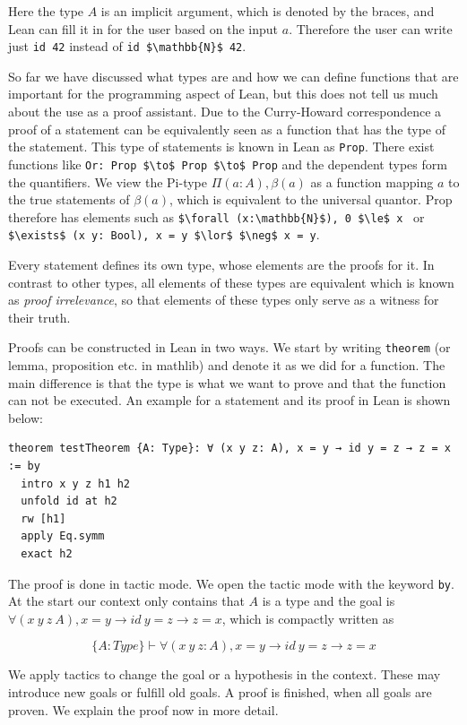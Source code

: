 Here the type $A$ is an implicit argument, which is denoted by the braces, and Lean can fill it in for the user based on the input $a$. Therefore the user can write just \lstinline|id 42| instead of \lstinline|id $\mathbb{N}$ 42|.

So far we have discussed what types are and how we can define functions that are important for the programming aspect of Lean, but this does not tell us much about the use as a proof assistant. Due to the Curry-Howard correspondence a proof of a statement can be equivalently seen as a function that has the type of the statement. This type of statements is known in Lean as \lstinline|Prop|. There exist functions like \lstinline|Or: Prop $\to$ Prop $\to$ Prop| and the dependent types form the quantifiers. We view the Pi-type $\Pi (a:A), \beta(a)$ as a function mapping $a$ to the true statements of $\beta(a)$, which is equivalent to the universal quantor. Prop therefore has elements such as \lstinline|$\forall (x:\mathbb{N}$), 0 $\le$ x | or \lstinline|$\exists$ (x y: Bool), x = y $\lor$ $\neg$ x = y|.

Every statement defines its own type, whose elements are the proofs for it. In contrast to other types, all elements of these types are equivalent which is known as \textit{proof irrelevance}, so that elements of these types only serve as a witness for their truth.

Proofs can be constructed in Lean in two ways.  We start by writing \lstinline|theorem| (or lemma, proposition etc. in mathlib) and denote it as we did for a function. The main difference is that the type is what we want to prove and that the function can not be executed. An example for a statement and its proof in Lean is shown below:

\begin{lstlisting}
theorem testTheorem {A: Type}: ∀ (x y z: A), x = y → id y = z → z = x := by
  intro x y z h1 h2
  unfold id at h2
  rw [h1]
  apply Eq.symm
  exact h2
\end{lstlisting}

The proof is done in tactic mode. We open the tactic mode with the keyword \lstinline|by|. At the start our context only contains that $A$ is a type and the goal is $∀ (x\ y\ z\: A), x = y → id\ y = z → z = x$, which is compactly written as

\[ \{A:Type\} \vdash ∀ (x\ y\ z: A), x = y → id\ y = z → z = x\]

We apply tactics to change the goal or a hypothesis in the context. These may introduce new goals or fulfill old goals. A proof is finished, when all goals are proven. We explain the proof now in more detail.

